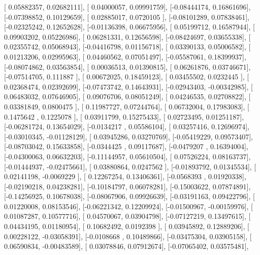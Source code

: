 \documentclass{article}
\begin{document}
       [ 0.05882357,  0.02682111],
       [ 0.04000057,  0.09991759],
       [-0.08444174,  0.16861696],
       [-0.07398852,  0.10129659],
       [ 0.02885017,  0.0720105 ],
       [-0.08101289,  0.07838461],
       [-0.02325242,  0.12652628],
       [-0.01136398,  0.06675956],
       [ 0.05199712,  0.16587944],
       [ 0.09903202,  0.05226986],
       [ 0.06281331,  0.12656598],
       [-0.08424697,  0.03655338],
       [ 0.02355742,  0.05068943],
       [-0.04416798,  0.01156718],
       [ 0.03390133,  0.05006582],
       [ 0.01213206,  0.02995963],
       [ 0.04460562,  0.07051497],
       [-0.05587061,  0.18399937],
       [-0.08074862,  0.03563854],
       [ 0.00036513,  0.01390815],
       [ 0.06261876,  0.03746671],
       [-0.07514705,  0.111887  ],
       [ 0.00672025,  0.18459123],
       [ 0.03455502,  0.0232445 ],
       [ 0.02368474,  0.02392699],
       [-0.07473742,  0.14643931],
       [-0.02943403, -0.00342985],
       [ 0.06483032,  0.07646905],
       [ 0.09076706,  0.08051249],
       [ 0.04246535,  0.02708822],
       [ 0.03381849,  0.0800475 ],
       [ 0.11987727,  0.07244764],
       [ 0.06732004,  0.17983083],
       [ 0.1475642 ,  0.1225078 ],
       [ 0.03911799,  0.15275433],
       [ 0.02723495,  0.01251187],
       [-0.06281724,  0.13654029],
       [-0.0134217 ,  0.05586104],
       [ 0.03257416,  0.12696974],
       [-0.03010345, -0.01128129],
       [ 0.03945286,  0.03270769],
       [-0.05419229,  0.09573407],
       [-0.08703042,  0.15633858],
       [-0.0344425 ,  0.09117687],
       [-0.0479207 ,  0.16394004],
       [-0.04300063,  0.06632203],
       [-0.11144957,  0.05610504],
       [ 0.07526224,  0.08163737],
       [-0.01444937, -0.02475661],
       [ 0.03880864,  0.0247562 ],
       [-0.01893792,  0.01345534],
       [ 0.02141198, -0.0069229 ],
       [ 0.12267254,  0.13406361],
       [-0.0568393 ,  0.01920338],
       [-0.02190218,  0.04238281],
       [-0.10184797,  0.06078281],
       [-0.15003622,  0.07874891],
       [-0.14256925,  0.10678038],
       [-0.08067906,  0.09926639],
       [-0.03191163,  0.09422796],
       [ 0.01220008,  0.08153546],
       [-0.06221342,  0.12209924],
       [-0.01500967, -0.00159976],
       [ 0.01087287,  0.10577716],
       [ 0.04570067,  0.03904798],
       [-0.07127219,  0.13497615],
       [ 0.04434195,  0.01180954],
       [ 0.10682492,  0.0192398 ],
       [ 0.03945892,  0.12889206],
       [ 0.00228122, -0.03058391],
       [-0.0108668 ,  0.10489866],
       [-0.03475304,  0.03905158],
       [ 0.06590834, -0.00483589],
       [ 0.03078846,  0.07912674],
       [-0.07065402,  0.03575481],
\end{document}
